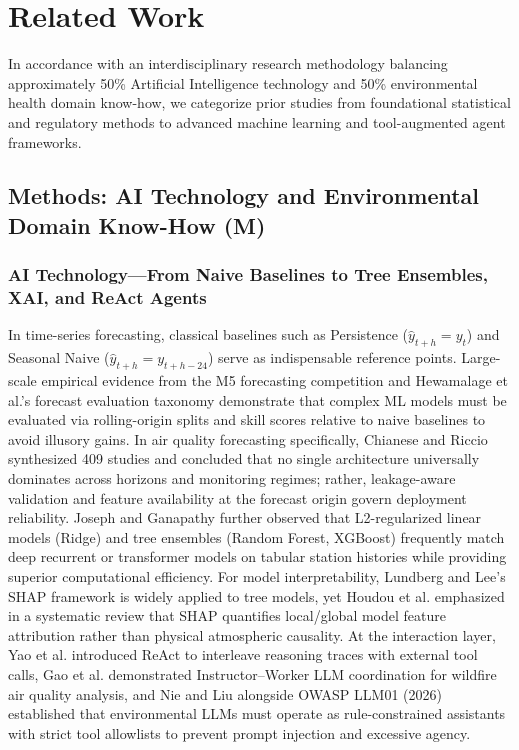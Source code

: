 \section{Related Work}

In accordance with an interdisciplinary research methodology balancing approximately 50\% Artificial Intelligence technology and 50\% environmental health domain know-how, we categorize prior studies from foundational statistical and regulatory methods to advanced machine learning and tool-augmented agent frameworks.

\subsection{Methods: AI Technology and Environmental Domain Know-How (M)}
\subsubsection{AI Technology---From Naive Baselines to Tree Ensembles, XAI, and ReAct Agents}
In time-series forecasting, classical baselines such as Persistence ($\hat{y}_{t+h} = y_t$) and Seasonal Naive ($\hat{y}_{t+h} = y_{t+h-24}$) serve as indispensable reference points. Large-scale empirical evidence from the M5 forecasting competition \cite{makridakis2022} and Hewamalage et al.'s forecast evaluation taxonomy \cite{hewamalage2023} demonstrate that complex ML models must be evaluated via rolling-origin splits and skill scores relative to naive baselines to avoid illusory gains. In air quality forecasting specifically, Chianese and Riccio \cite{chianese2026} synthesized 409 studies and concluded that no single architecture universally dominates across horizons and monitoring regimes; rather, leakage-aware validation \cite{lu2026} and feature availability at the forecast origin govern deployment reliability. Joseph and Ganapathy \cite{joseph2025} further observed that L2-regularized linear models (Ridge) and tree ensembles (Random Forest, XGBoost) frequently match deep recurrent or transformer models on tabular station histories while providing superior computational efficiency. For model interpretability, Lundberg and Lee's SHAP framework \cite{lundberg2017} is widely applied to tree models, yet Houdou et al. \cite{houdou2024} emphasized in a systematic review that SHAP quantifies local/global model feature attribution rather than physical atmospheric causality. At the interaction layer, Yao et al. \cite{yao2023} introduced ReAct to interleave reasoning traces with external tool calls, Gao et al. \cite{gao2025} demonstrated Instructor--Worker LLM coordination for wildfire air quality analysis, and Nie and Liu \cite{nie2025} alongside OWASP LLM01 (2026) \cite{owasp2026} established that environmental LLMs must operate as rule-constrained assistants with strict tool allowlists to prevent prompt injection and excessive agency.

